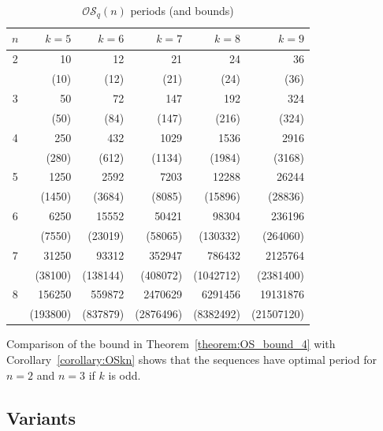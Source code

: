 \documentclass[a4paper,11pt]{article}
\begin{document}
\begin{table}[htb]
\caption{$\mathcal{OS}_q(n)$ periods (and bounds)} \label{table:OS_periods}
\begin{center}

\begin{tabular}{c|rrrrr} \hline
$n$ & $k=5$    & $k=6$    & $k=7$     & $k=8$     & $k=9$      \\ \hline
2   & 10       & 12       & 21        & 24        & 36         \\
    & (10)     & (12)     & (21)      & (24)      & (36)       \\ \hline
3   & 50       & 72       & 147       & 192       & 324        \\
    & (50)     & (84)     & (147)     & (216)     & (324)      \\ \hline
4   & 250      & 432      & 1029      & 1536      & 2916       \\
    & (280)    & (612)    & (1134)    & (1984)    & (3168)     \\ \hline
5   & 1250     & 2592     & 7203      & 12288     & 26244      \\
    & (1450)   & (3684)   & (8085)    & (15896)   & (28836)    \\ \hline
6   & 6250     & 15552    & 50421     & 98304     & 236196     \\
    & (7550)   & (23019)  & (58065)   & (130332)  & (264060)   \\ \hline
7   & 31250    & 93312    & 352947    & 786432    & 2125764    \\
    & (38100)  & (138144) & (408072)  & (1042712) & (2381400) \\ \hline
8   & 156250   & 559872   & 2470629   & 6291456   & 19131876   \\
    & (193800) & (837879) & (2876496) & (8382492) & (21507120) \\ \hline
\end{tabular}

\end{center}
\end{table}

Comparison of the bound in Theorem~\ref{theorem:OS_bound_4} with Corollary~\ref{corollary:OSkn}
shows that the sequences have optimal period for $n=2$ and $n=3$ if $k$ is odd.



\subsection{Variants}
\end{document}
